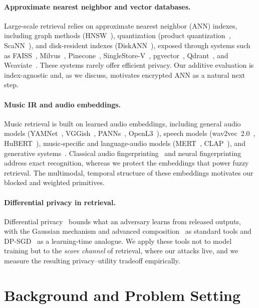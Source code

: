 \documentclass[sigconf,nonacm]{acmart}
\begin{document}
\paragraph{Approximate nearest neighbor and vector databases.}
Large-scale retrieval relies on approximate nearest neighbor (ANN) indexes, including graph methods (HNSW~\cite{hnsw}), quantization (product quantization~\cite{pq2011}, ScaNN~\cite{scann2020}), and disk-resident indexes (DiskANN~\cite{diskann2019}), exposed through systems such as FAISS~\cite{johnson2017faiss}, Milvus~\cite{milvus2021}, Pinecone~\cite{pinecone}, SingleStore-V~\cite{singlestorev}, pgvector~\cite{pgvector}, Qdrant~\cite{qdrant}, and Weaviate~\cite{weaviate}. These systems rarely offer efficient privacy. Our additive evaluation is index-agnostic and, as we discuss, motivates encrypted ANN as a natural next step.

\paragraph{Music IR and audio embeddings.}
Music retrieval is built on learned audio embeddings, including general audio models (YAMNet~\cite{plakal2020yamnet}, VGGish~\cite{vggish2017}, PANNs~\cite{panns2020}, OpenL3~\cite{openl3_2019}), speech models (wav2vec~2.0~\cite{wav2vec2020}, HuBERT~\cite{hubert2021}), music-specific and language-audio models (MERT~\cite{mert2024}, CLAP~\cite{wu2024clap}), and generative systems~\cite{musicgen2023,audiolm2023}. Classical audio fingerprinting~\cite{shazam2003,chromaprint,panako2014} and neural fingerprinting~\cite{neuralfp2021} address exact recognition, whereas we protect the embeddings that power fuzzy retrieval. The multimodal, temporal structure of these embeddings motivates our blocked and weighted primitives.

\paragraph{Differential privacy in retrieval.}
Differential privacy~\cite{dwork2006calibrating,dwork2014algorithmic} bounds what an adversary learns from released outputs, with the Gaussian mechanism and advanced composition~\cite{dwork2010composition} as standard tools and DP-SGD~\cite{dpsgd2016} as a learning-time analogue. We apply these tools not to model training but to the \emph{score channel} of retrieval, where our attacks live, and we measure the resulting privacy--utility tradeoff empirically.

\section{Background and Problem Setting}
\label{sec:background}
\end{document}
